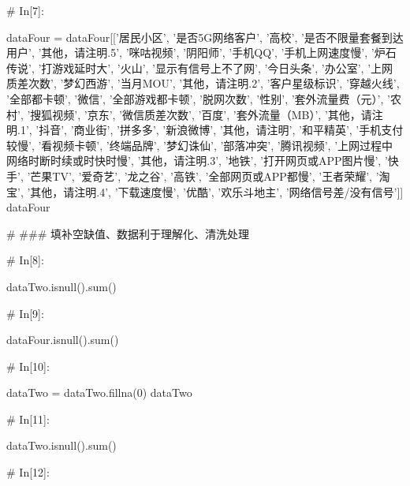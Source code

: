 \documentclass{MathorCupmodeling}
\begin{document}
\begin{python}
	# In[7]:
	
	
	dataFour = dataFour[['居民小区', '是否5G网络客户', '高校', '是否不限量套餐到达用户', '其他，请注明.5', '咪咕视频', '阴阳师', '手机QQ', '手机上网速度慢', '炉石传说', '打游戏延时大', '火山', '显示有信号上不了网', '今日头条', '办公室', '上网质差次数', '梦幻西游', '当月MOU', '其他，请注明.2', '客户星级标识', '穿越火线', '全部都卡顿', '微信', '全部游戏都卡顿', '脱网次数', '性别', '套外流量费（元）', '农村', '搜狐视频', '京东', '微信质差次数', '百度', '套外流量（MB）', '其他，请注明.1', '抖音', '商业街', '拼多多', '新浪微博', '其他，请注明', '和平精英', '手机支付较慢', '看视频卡顿', '终端品牌', '梦幻诛仙', '部落冲突', '腾讯视频', '上网过程中网络时断时续或时快时慢', '其他，请注明.3', '地铁', '打开网页或APP图片慢', '快手', '芒果TV', '爱奇艺', '龙之谷', '高铁', '全部网页或APP都慢', '王者荣耀', '淘宝', '其他，请注明.4', '下载速度慢', '优酷', '欢乐斗地主', '网络信号差/没有信号']]
	dataFour
	
	# ### 填补空缺值、数据利于理解化、清洗处理
	
	# In[8]:
	
	
	dataTwo.isnull().sum()
	
	# In[9]:
	
	
	dataFour.isnull().sum()
	
	# In[10]:
	
	
	dataTwo = dataTwo.fillna(0)
	dataTwo
	
	# In[11]:
	
	
	dataTwo.isnull().sum()
	
	# In[12]:
	

\end{python}
\end{document}
